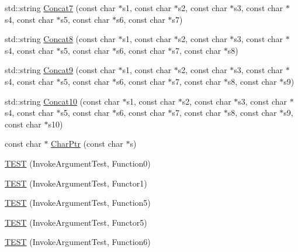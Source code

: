 \begin{DoxyCompactItemize}
\item 
std\+::string \mbox{\hyperlink{namespacetesting_1_1gmock__generated__actions__test_aab764d169a360cb5d3cbcd75dd15aa4a}{Concat7}} (const char $\ast$s1, const char $\ast$s2, const char $\ast$s3, const char $\ast$s4, const char $\ast$s5, const char $\ast$s6, const char $\ast$s7)
\item 
std\+::string \mbox{\hyperlink{namespacetesting_1_1gmock__generated__actions__test_a1f2f8cb9de8d3cc3affccab4e33a78e6}{Concat8}} (const char $\ast$s1, const char $\ast$s2, const char $\ast$s3, const char $\ast$s4, const char $\ast$s5, const char $\ast$s6, const char $\ast$s7, const char $\ast$s8)
\item 
std\+::string \mbox{\hyperlink{namespacetesting_1_1gmock__generated__actions__test_a923b7a16f0ea702fad1c8b2f9be8902d}{Concat9}} (const char $\ast$s1, const char $\ast$s2, const char $\ast$s3, const char $\ast$s4, const char $\ast$s5, const char $\ast$s6, const char $\ast$s7, const char $\ast$s8, const char $\ast$s9)
\item 
std\+::string \mbox{\hyperlink{namespacetesting_1_1gmock__generated__actions__test_aa3e21c9555fb8d1eafd7186d1e9b2db3}{Concat10}} (const char $\ast$s1, const char $\ast$s2, const char $\ast$s3, const char $\ast$s4, const char $\ast$s5, const char $\ast$s6, const char $\ast$s7, const char $\ast$s8, const char $\ast$s9, const char $\ast$s10)
\item 
const char $\ast$ \mbox{\hyperlink{namespacetesting_1_1gmock__generated__actions__test_a4532ef916bb515ce84af3826c95a8560}{Char\+Ptr}} (const char $\ast$s)
\item 
\mbox{\hyperlink{namespacetesting_1_1gmock__generated__actions__test_aee4ab8d88ec59a7e3b91d919a6ed34da}{T\+E\+ST}} (Invoke\+Argument\+Test, Function0)
\item 
\mbox{\hyperlink{namespacetesting_1_1gmock__generated__actions__test_a47d12c8e504971d1f1c17df8d90bff82}{T\+E\+ST}} (Invoke\+Argument\+Test, Functor1)
\item 
\mbox{\hyperlink{namespacetesting_1_1gmock__generated__actions__test_a6afe3cf31ef3f5a9d6fd6af05c9de95c}{T\+E\+ST}} (Invoke\+Argument\+Test, Function5)
\item 
\mbox{\hyperlink{namespacetesting_1_1gmock__generated__actions__test_aab59917791fb297d6735d46e9a862be1}{T\+E\+ST}} (Invoke\+Argument\+Test, Functor5)
\item 
\mbox{\hyperlink{namespacetesting_1_1gmock__generated__actions__test_ae3f8bdac5c2ea1cf56ff1484ebb9a44e}{T\+E\+ST}} (Invoke\+Argument\+Test, Function6)

\end{DoxyCompactItemize}
